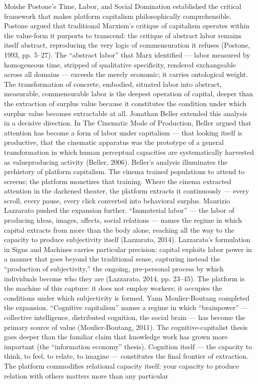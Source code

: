 Moishe Postone’s Time, Labor, and Social Domination established the critical framework that makes platform capitalism philosophically comprehensible. Postone argued that traditional Marxism’s critique of capitalism operates within the value-form it purports to transcend: the critique of abstract labor remains itself abstract, reproducing the very logic of commensuration it refuses (Postone, 1993, pp. 5–27). The “abstract labor” that Marx identified — labor measured by homogeneous time, stripped of qualitative specificity, rendered exchangeable across all domains — exceeds the merely economic; it carries ontological weight. The transformation of concrete, embodied, situated labor into abstract, measurable, commensurable labor is the deepest operation of capital, deeper than the extraction of surplus value because it constitutes the condition under which surplus value becomes extractable at all. Jonathan Beller extended this analysis in a decisive direction. In The Cinematic Mode of Production, Beller argued that attention has become a form of labor under capitalism — that looking itself is productive, that the cinematic apparatus was the prototype of a general transformation in which human perceptual capacities are systematically harvested as valueproducing activity (Beller, 2006). Beller’s analysis illuminates the prehistory of platform capitalism. The cinema trained populations to attend to screens; the platform monetizes that training. Where the cinema extracted attention in the darkened theater, the platform extracts it continuously — every scroll, every pause, every click converted into behavioral surplus. Maurizio Lazzarato pushed the expansion further. “Immaterial labor” — the labor of producing ideas, images, affects, social relations — names the regime in which capital extracts from more than the body alone, reaching all the way to the capacity to produce subjectivity itself (Lazzarato, 2014). Lazzarato’s formulation in Signs and Machines carries particular precision: capital exploits labor power in a manner that goes beyond the traditional sense, capturing instead the “production of subjectivity,” the ongoing, pre-personal process by which individuals become who they are (Lazzarato, 2014, pp. 23–45). The platform is the machine of this capture: it does not employ workers; it occupies the conditions under which subjectivity is formed. Yann Moulier-Boutang completed the expansion. “Cognitive capitalism” names a regime in which “brainpower” — collective intelligence, distributed cognition, the social brain — has become the primary source of value (Moulier-Boutang, 2011). The cognitive-capitalist thesis goes deeper than the familiar claim that knowledge work has grown more important (the “information economy” thesis). Cognition itself — the capacity to think, to feel, to relate, to imagine — constitutes the final frontier of extraction. The platform commodifies relational capacity itself: your capacity to produce relation with others matters more than any particular

